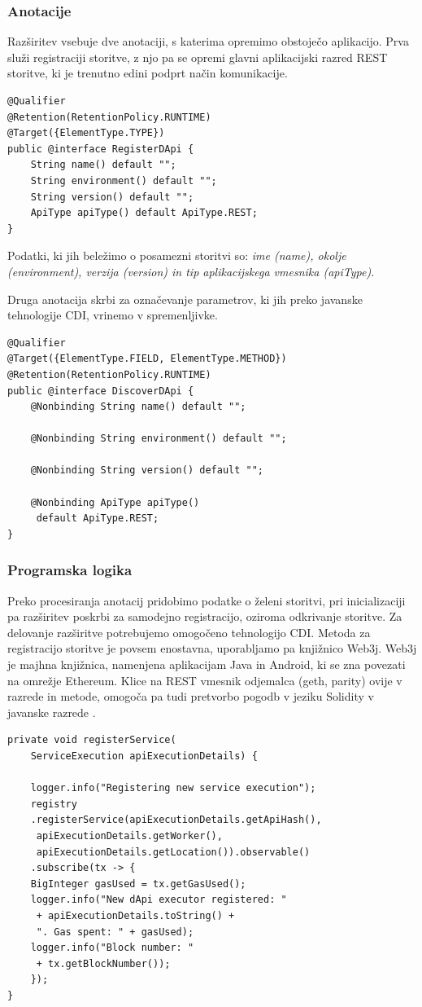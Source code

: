 \documentclass[a4paper, 12pt]{book}
\begin{document}
\subsubsection{Anotacije}
Razširitev vsebuje dve anotaciji, s katerima opremimo obstoječo aplikacijo.
Prva služi registraciji storitve, z njo pa se opremi glavni aplikacijski razred REST storitve, ki je trenutno edini podprt način komunikacije.

\begin{lstlisting}
@Qualifier
@Retention(RetentionPolicy.RUNTIME)
@Target({ElementType.TYPE})
public @interface RegisterDApi {
	String name() default "";
	String environment() default "";
	String version() default "";
	ApiType apiType() default ApiType.REST;
}
\end{lstlisting}

Podatki, ki jih beležimo o posamezni storitvi so: \textit{ime (name), okolje (environment), verzija (version) in tip aplikacijskega vmesnika (apiType)}.


Druga anotacija skrbi za označevanje parametrov, ki jih preko javanske tehnologije CDI, vrinemo v spremenljivke.

\begin{lstlisting}
@Qualifier
@Target({ElementType.FIELD, ElementType.METHOD})
@Retention(RetentionPolicy.RUNTIME)
public @interface DiscoverDApi {
	@Nonbinding String name() default "";
	
	@Nonbinding String environment() default "";
	
	@Nonbinding String version() default "";
	
	@Nonbinding ApiType apiType()
	 default ApiType.REST;
}
\end{lstlisting}

\subsubsection{Programska logika}
Preko procesiranja anotacij pridobimo podatke o želeni storitvi, pri inicializaciji pa razširitev poskrbi za samodejno registracijo, oziroma odkrivanje storitve.
Za delovanje razširitve potrebujemo omogočeno tehnologijo CDI.
Metoda za registracijo storitve je povsem enostavna, uporabljamo pa knjižnico Web3j.
Web3j je majhna knjižnica, namenjena aplikacijam Java in Android, ki se zna povezati na omrežje Ethereum.
Klice na REST vmesnik odjemalca (geth, parity) ovije v razrede in metode, omogoča pa tudi pretvorbo pogodb v jeziku Solidity v javanske razrede \cite{web3j}.

\begin{lstlisting}
private void registerService(
	ServiceExecution apiExecutionDetails) {
	
	logger.info("Registering new service execution");
	registry
	.registerService(apiExecutionDetails.getApiHash(),
	 apiExecutionDetails.getWorker(),
	 apiExecutionDetails.getLocation()).observable()
	.subscribe(tx -> {
	BigInteger gasUsed = tx.getGasUsed();
	logger.info("New dApi executor registered: "
	 + apiExecutionDetails.toString() + 
	 ". Gas spent: " + gasUsed);
	logger.info("Block number: "
	 + tx.getBlockNumber());
	});
}
\end{lstlisting}
\end{document}

